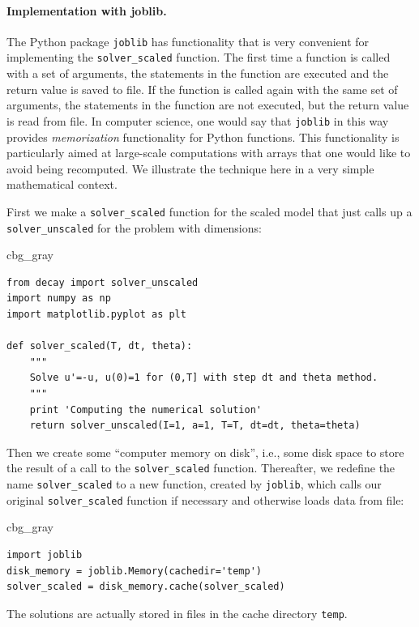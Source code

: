 \documentclass[graybox,envcountchap,sectrefs,final]{svmonodo}
\newenvironment{_cod_tight}[1]{
   \def\FrameCommand{\colorbox{#1}}
   \FrameRule0.6pt\MakeFramed {\FrameRestore}\vskip3mm}
   {\vskip0mm\endMakeFramed}
\newenvironment{cod}[1]{
\bgroup\rmfamily
\fboxsep=0mm\relax
\begin{_cod_tight}{#1}
\list{}{\parsep=-2mm\parskip=0mm\topsep=0pt\leftmargin=2mm
\rightmargin=2\leftmargin\leftmargin=4pt\relax}
\item\relax}
{\endlist\end{_cod_tight}\egroup}
\begin{document}

\paragraph{Implementation with joblib.}
The Python package \texttt{joblib} has functionality that is very convenient
for implementing the \Verb!solver_scaled! function. The first time a
function is called with a set of arguments, the statements in the
function are executed and the return value is saved to file. If the
function is called again with the same set of arguments, the
statements in the function are not executed, but the return value is
read from file. In computer science, one would say that \texttt{joblib} in
this way provides \emph{memorization} functionality for Python functions.
This functionality is particularly aimed at large-scale computations
with arrays that one would like to avoid being recomputed. We
illustrate the technique here in a very simple mathematical context.

First we make a \Verb!solver_scaled! function for the scaled
model that just calls up a \Verb!solver_unscaled! for the problem with
dimensions:

\begin{cod}{cbg_gray}\begin{Verbatim}[numbers=none,fontsize=\fontsize{9pt}{9pt},baselinestretch=0.95,xleftmargin=2mm]
from decay import solver_unscaled
import numpy as np
import matplotlib.pyplot as plt

def solver_scaled(T, dt, theta):
    """
    Solve u'=-u, u(0)=1 for (0,T] with step dt and theta method.
    """
    print 'Computing the numerical solution'
    return solver_unscaled(I=1, a=1, T=T, dt=dt, theta=theta)
\end{Verbatim}
\end{cod}
\noindent
Then we create some ``computer memory on disk'', i.e., some disk space to
store the result of a call to the \Verb!solver_scaled! function. Thereafter,
we redefine the name \Verb!solver_scaled! to a new function, created
by \texttt{joblib}, which calls our original \Verb!solver_scaled! function
if necessary and otherwise loads data from file:

\begin{cod}{cbg_gray}\begin{Verbatim}[numbers=none,fontsize=\fontsize{9pt}{9pt},baselinestretch=0.95,xleftmargin=2mm]
import joblib
disk_memory = joblib.Memory(cachedir='temp')
solver_scaled = disk_memory.cache(solver_scaled)
\end{Verbatim}
\end{cod}
\noindent
The solutions are actually stored in files in the cache directory \texttt{temp}.
\end{document}
